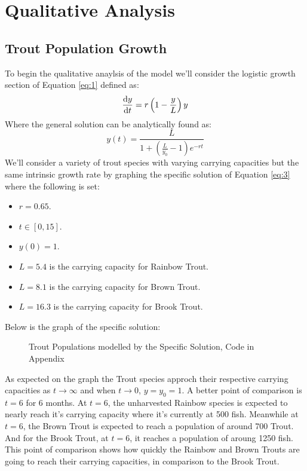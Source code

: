 \documentclass[letterpaper,12pt]{article}
\begin{document}
\section{Qualitative Analysis}
\subsection{Trout Population Growth}
To begin the qualitative anaylsis of the model we'll consider the logistic growth section of Equation \eqref{eq:1} defined as:
\begin{equation*}
    \dv{y}{t} = r\left(1 - \frac{y}{L}\right)y
\end{equation*}
Where the general solution can be analytically found as:
\begin{equation} \label{eq:3}
    y(t) = \frac{L}{1 + \left(\frac{L}{y_0} - 1\right)e^{-rt}}
\end{equation}
We'll consider a variety of trout species with varying carrying capacities but the same intrinsic growth rate by graphing the specific solution of Equation \eqref{eq:3} where the following is set:
\begin{itemize}
    \item \(r = 0.65\).
    \item \(t \in [0,15]\).
    \item \(y(0) = 1\).
    \item \(L = 5.4\) is the carrying capacity for Rainbow Trout.
    \item \(L = 8.1\) is the carrying capacity for Brown Trout.
    \item \(L = 16.3\) is the carrying capacity for Brook Trout.
\end{itemize}
Below is the graph of the specific solution:
\newline
\begin{figure}[H]
    \centering
    
    \caption{Trout Populations modelled by the Specific Solution, Code in Appendix}
    \label{fig:1}
\end{figure}
As expected on the graph the Trout species approch their respective carrying capacities as \(t \to \infty\) and when \(t \to 0\), \(y = y_0 = 1\).
A better point of comparison is \(t = 6\) for 6 months.
At \(t = 6\), the unharvested Rainbow species is expected to nearly reach it's carrying capacity where it's currently at 500 fish.
Meanwhile at \(t = 6\), the Brown Trout is expected to reach a population of around 700 Trout.
And for the Brook Trout, at \(t = 6\), it reaches a population of aroung 1250 fish.
This point of comparison shows how quickly the Rainbow and Brown Trouts are going to reach their carrying capacities, in comparison to the Brook Trout.
\end{document}
